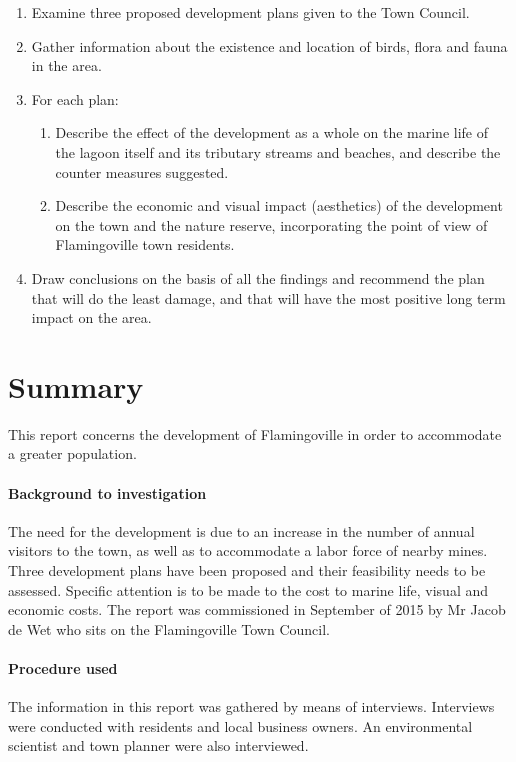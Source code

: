 \documentclass{article}
\begin{document}
\begin{enumerate}
	\item Examine three proposed development plans given to the Town Council.
	\item Gather information about the existence and location of birds, flora and fauna in the area.
	\item For each plan:
	\begin{enumerate}
		\item Describe the effect of the development as a whole on the marine life of the lagoon itself and its tributary streams and beaches, and describe the counter measures suggested.
		\item Describe the economic and visual impact (aesthetics) of the development on the town and the nature reserve, incorporating the point of view of Flamingoville town residents.
	\end{enumerate}
	\item Draw conclusions on the basis of all the findings and recommend the plan that will do the least damage, and that will have the most positive long term impact on the area.
\end{enumerate}

\newpage
\section*{Summary}
This report concerns the development of Flamingoville in order to accommodate a greater population.


\paragraph{Background to investigation}
The need for the development is due to an increase in the number of annual visitors to the town, as well as to accommodate a labor force of nearby mines. Three development plans have been proposed and their feasibility needs to be assessed. Specific attention is to be made to the cost to marine life, visual and economic costs. The report was commissioned in September of 2015 by Mr Jacob de Wet who sits on the Flamingoville Town Council.

\paragraph{Procedure used}
The information in this report was gathered by means of interviews. Interviews were conducted with residents and local business owners. An environmental scientist and town planner were also interviewed.
\end{document}
